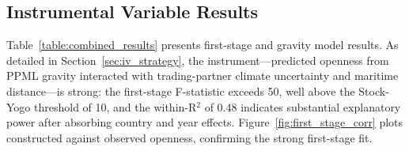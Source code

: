 \documentclass[10pt]{article}
\begin{document}
\subsection{Instrumental Variable Results}
\label{sec:iv_results}

Table~\ref{table:combined_results} presents first-stage and gravity model results. As detailed in Section~\ref{sec:iv_strategy}, the instrument---predicted openness from PPML gravity interacted with trading-partner climate uncertainty and maritime distance---is strong: the first-stage F-statistic exceeds 50, well above the Stock-Yogo threshold of 10, and the within-R$^2$ of 0.48 indicates substantial explanatory power after absorbing country and year effects. Figure~\ref{fig:first_stage_corr} plots constructed against observed openness, confirming the strong first-stage fit.
\end{document}
